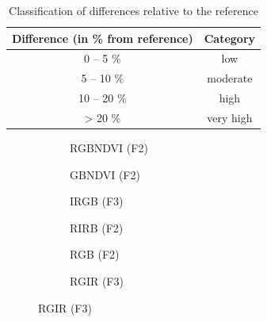 \begin{table}[h]
\centering
\begin{tabular}{c c}
\hline
\textbf{Difference (in \% from reference)} & \textbf{Category} \\ \hline
0 -- 5 \%   & low \\ 
5 -- 10 \%  & moderate \\ 
10 -- 20 \% & high \\ 
> 20 \%     & very high \\ \hline
\end{tabular}
\caption{Classification of differences relative to the reference}
\label{tab:diff_cat}
\end{table}

\begin{figure}[htbp]
    \centering
    \begin{subfigure}{0.48\textwidth}
        \centering
        
        \caption{RGBNDVI (F2)}
        \label{fig:perm_exp_diffM_rgbndvi_f2}
    \end{subfigure}
    \begin{subfigure}{0.48\textwidth}
        \centering
        
        \caption{GBNDVI (F2)}
        \label{fig:perm_exp_diffM_gbndvi_f2}
    \end{subfigure}
    
    \begin{subfigure}{0.48\textwidth}
        \centering
        
        \caption{IRGB (F3)}
        \label{fig:perm_exp_diffM_irgb_f3}
    \end{subfigure}
    \begin{subfigure}{0.48\textwidth}
        \centering
        
        \caption{RIRB (F2)}
        \label{fig:perm_exp_diffM_RIRB_f2}
    \end{subfigure}
    
    \begin{subfigure}{0.48\textwidth}
        \centering
        
        \caption{RGB (F2)}
        \label{fig:perm_exp_diffM_RGB_f2}
    \end{subfigure}
    \begin{subfigure}{0.48\textwidth}
        \centering
        
        \caption{RGIR (F3)}
        \label{fig:perm_exp_diffM_RGIR_f3}
    \end{subfigure}


\end{figure}
